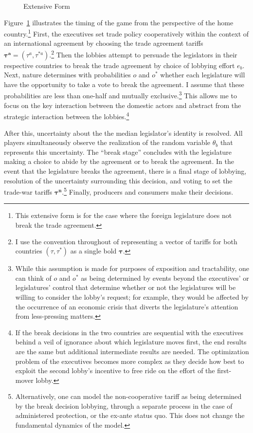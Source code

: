 \documentclass[10pt]{article}
\newcommand{\ta}{\theta}
\newcommand{\bta}{\bm{\tau^a}}
\newcommand{\btn}{\bm{\tau^n}}
\begin{document}
\begin{figure}
	\begin{center}
		
	\end{center}
	\caption{Extensive Form\label{fig:ext}}
\end{figure}

Figure~\ref{fig:ext} illustrates the timing of the game from the perspective of the home country.\footnote{This extensive form is for the case where the foreign legislature does not break the trade agreement.} First, the executives set trade policy cooperatively within the context of an international agreement by choosing the trade agreement tariffs $\bta = \left(\tau^a,\tau^{*a}\right)$.\footnote{I use the convention throughout of representing a vector of tariffs for both countries $(\tau,\tau^*)$ as a single bold $\bm{\tau}$.} Then the lobbies attempt to persuade the legislators in their respective countries to break the trade agreement by choice of lobbying effort $e_b$. Next, nature determines with probabilities $o$ and $o^*$ whether each legislature will have the opportunity to take a vote to break the agreement. I assume that these probabilities are less than one-half and mutually exclusive.\footnote{While this assumption is made for purposes of exposition and tractability, one can think of $o$ and $o^*$ as being determined by events beyond the executives' or legislatures' control that determine whether or not the legislatures will be willing to consider the lobby's request; for example, they would be affected by the occurrence of an economic crisis that diverts the legislature's attention from less-pressing matters.} This allows me to focus on the key interaction between the domestic actors and abstract from the strategic interaction between the lobbies.\footnote{If the break decisions in the two countries are sequential with the executives behind a veil of ignorance about which legislature moves first, the end results are the same but additional intermediate results are needed. The optimization problem of the executives becomes more complex as they decide how best to exploit the second lobby's incentive to free ride on the effort of the first-mover lobby.}

After this, uncertainty about the the median legislator's identity is resolved. All players simultaneously observe the realization of the random variable $\ta_b$ that represents this uncertainty. The ``break stage'' concludes with the legislature making a choice to abide by the agreement or to break the agreement. In the event that the legislature breaks the agreement, there is a final stage of lobbying, resolution of the uncertainty surrounding this decision, and voting to set the trade-war tariffs $\btn$.\footnote{Alternatively, one can model the non-cooperative tariff as being determined by the break decision lobbying, through a separate process in the case of administered protection, or the ex-ante status quo. This does not change the fundamental dynamics of the model.} Finally, producers and consumers make their decisions.
\end{document}
